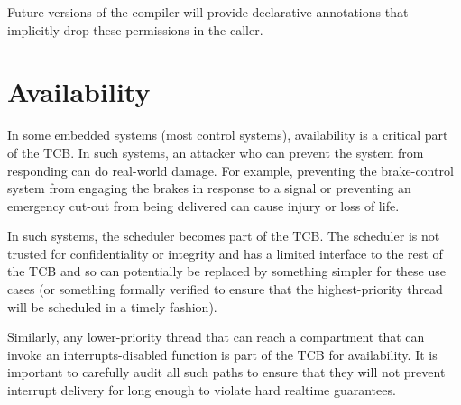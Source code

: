 Future versions of the compiler will provide declarative annotations that implicitly drop these permissions in the caller.


\section{Availability}

In some embedded systems (most control systems), availability is a critical part of the TCB.
In such systems, an attacker who can prevent the system from responding can do real-world damage.
For example, preventing the brake-control system from engaging the brakes in response to a signal or preventing an emergency cut-out from being delivered can cause injury or loss of life.

In such systems, the scheduler becomes part of the TCB.
The scheduler is not trusted for confidentiality or integrity and has a limited interface to the rest of the TCB and so can potentially be replaced by something simpler for these use cases (or something formally verified to ensure that the highest-priority thread will be scheduled in a timely fashion).

Similarly, any lower-priority thread that can reach a compartment that can invoke an interrupts-disabled function is part of the TCB for availability.
It is important to carefully audit all such paths to ensure that they will not prevent interrupt delivery for long enough to violate hard realtime guarantees.

